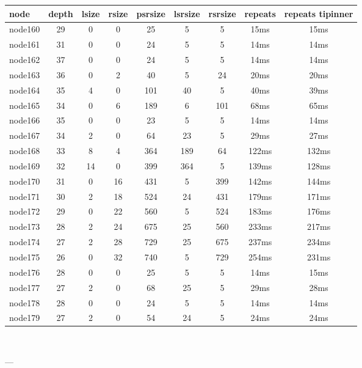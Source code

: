 \begin{tabular}{|l|c|c|c|c|c|c|c|c|}
\hline node & depth & lsize & rsize & psrsize & lsrsize & rsrsize   & repeats & repeats tipinner\\
    \hline node160 & 29 & 0 & 0 & 25 & 5 & 5 & 15ms & 15ms\\
    \hline node161 & 31 & 0 & 0 & 24 & 5 & 5 & 14ms & 14ms\\
    \hline node162 & 37 & 0 & 0 & 24 & 5 & 5 & 14ms & 14ms\\
    \hline node163 & 36 & 0 & 2 & 40 & 5 & 24 & 20ms & 20ms\\
    \hline node164 & 35 & 4 & 0 & 101 & 40 & 5 & 40ms & 39ms\\
    \hline node165 & 34 & 0 & 6 & 189 & 6 & 101 & 68ms & 65ms\\
    \hline node166 & 35 & 0 & 0 & 23 & 5 & 5 & 14ms & 14ms\\
    \hline node167 & 34 & 2 & 0 & 64 & 23 & 5 & 29ms & 27ms\\
    \hline node168 & 33 & 8 & 4 & 364 & 189 & 64 & 122ms & 132ms\\
    \hline node169 & 32 & 14 & 0 & 399 & 364 & 5 & 139ms & 128ms\\
    \hline node170 & 31 & 0 & 16 & 431 & 5 & 399 & 142ms & 144ms\\
    \hline node171 & 30 & 2 & 18 & 524 & 24 & 431 & 179ms & 171ms\\
    \hline node172 & 29 & 0 & 22 & 560 & 5 & 524 & 183ms & 176ms\\
    \hline node173 & 28 & 2 & 24 & 675 & 25 & 560 & 233ms & 217ms\\
    \hline node174 & 27 & 2 & 28 & 729 & 25 & 675 & 237ms & 234ms\\
    \hline node175 & 26 & 0 & 32 & 740 & 5 & 729 & 254ms & 231ms\\
    \hline node176 & 28 & 0 & 0 & 25 & 5 & 5 & 14ms & 15ms\\
    \hline node177 & 27 & 2 & 0 & 68 & 25 & 5 & 29ms & 28ms\\
    \hline node178 & 28 & 0 & 0 & 24 & 5 & 5 & 14ms & 14ms\\
    \hline node179 & 27 & 2 & 0 & 54 & 24 & 5 & 24ms & 24ms\\

\hline
\end{tabular} \

---


